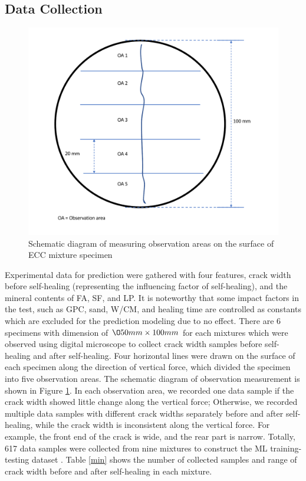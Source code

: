\documentclass[11pt]{article}
\begin{document}
	\subsection{Data Collection}
	\label{dc}
	
	\begin{figure}[!h]
		\centering
		\includegraphics[width=.75\textwidth]{measurement}
		\caption{Schematic diagram of measuring observation areas on the surface of ECC mixture specimen}
		\label{ma}
	\end{figure}
	
	
	Experimental data for prediction were gathered with four features, crack width before self-healing (representing the influencing factor of self-healing), and the mineral contents of  FA, SF, and LP. It is noteworthy that some impact factors in the test, such as GPC, sand, W/CM, and healing time are controlled as constants which are excluded for the prediction modeling due to no effect. There are 6 specimens with dimension of $\O 50mm \times 100mm$ for each mixtures which were observed using digital microscope to collect crack width samples before self-healing and after self-healing. Four horizontal lines were drawn on the surface of each specimen along the direction of vertical force, which divided the specimen into five observation areas. The schematic diagram of observation measurement is shown in Figure \ref{ma}. In each observation area, we recorded one data sample if the crack width showed little change along the vertical force; Otherwise, we recorded multiple data samples with different crack widths separately before and after self-healing, while the crack width is inconsistent along the vertical force. For example, the front end of the crack is wide, and the rear part is narrow. Totally, 617 data samples were collected from nine mixtures to construct the ML training-testing dataset \cite{chen2021selfhealing}. Table \ref{min} shows the number of collected samples and range of crack width before and after self-healing in each mixture. 
	
\end{document}
